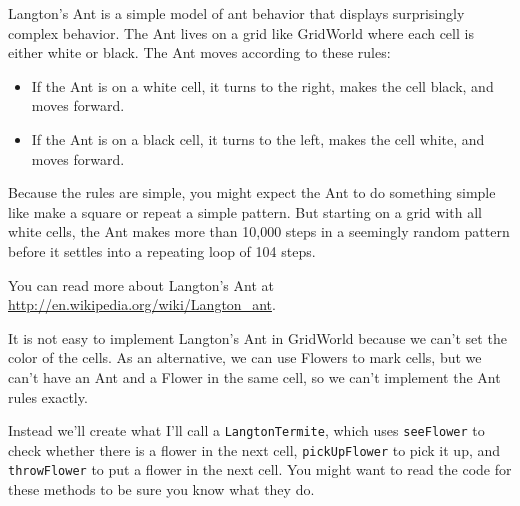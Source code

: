 \documentclass[12pt]{book}
\theoremstyle{definition}
\begin{document}
Langton's Ant is a simple model of ant behavior that 
displays surprisingly complex behavior.  The Ant lives on a grid
like GridWorld where each cell is either white or black.  The
Ant moves according to these rules:

\begin{itemize}

\item If the Ant is on a white cell, it turns to the right,
makes the cell black, and moves forward.

\item If the Ant is on a black cell, it turns to the left,
makes the cell white, and moves forward.

\end{itemize}

Because the rules are simple, you might expect the Ant to do
something simple like make a square or repeat a simple
pattern.  But starting on a grid with all white cells, the
Ant makes more than 10,000 steps in a seemingly random pattern
before it settles into a repeating loop of 104 steps.

You can read more about Langton's
Ant at \url{http://en.wikipedia.org/wiki/Langton_ant}.

It is not easy to implement 
Langton's Ant in GridWorld because we can't set the color of
the cells.  As an alternative, we can use Flowers to mark
cells, but we can't have an Ant and a Flower in the same cell,
so we can't implement the Ant rules exactly.

Instead we'll create what I'll call a {\tt LangtonTermite}, which uses
{\tt seeFlower} to check whether there is a flower in the next cell,
{\tt pickUpFlower} to pick it up,
and {\tt throwFlower} to put a flower in the next cell.  You
might want to read the code for these methods to be sure you
know what they do.
\end{document}
